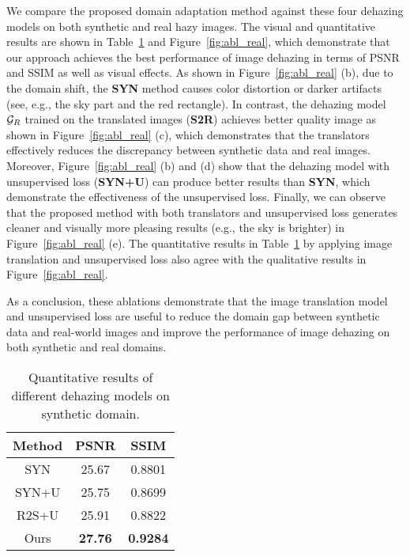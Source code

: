 \documentclass[10pt,twocolumn,letterpaper]{article}
\begin{document}
We compare the proposed domain adaptation method against these four dehazing models on both synthetic and real hazy images. 
The visual and quantitative results are shown in Table~\ref{tab:abl_syn} and Figure~\ref{fig:abl_real}, which demonstrate that our approach achieves the best performance of image dehazing in terms of PSNR and SSIM as well as visual effects.
As shown in Figure~\ref{fig:abl_real} (b), due to the domain shift, the \textbf{SYN} method causes color distortion or darker artifacts (see, e.g., the sky part and the red rectangle). 
In contrast, 
the dehazing model ${{\cal G}_R}$ trained on the translated images (\textbf{S2R}) achieves better quality image as shown in Figure~\ref{fig:abl_real} (c), which demonstrates that the translators effectively reduces the discrepancy between synthetic data and real images.
Moreover, Figure~\ref{fig:abl_real} (b) and (d) show that the dehazing model with unsupervised loss (\textbf{SYN+U}) can produce better results than \textbf{SYN}, which demonstrate the effectiveness of the unsupervised loss.
Finally, we can observe that the proposed method with both translators and unsupervised loss generates cleaner and visually more pleasing results (e.g., the sky is brighter) in Figure~\ref{fig:abl_real} (e).
The quantitative results in Table~\ref{tab:abl_syn} by applying image translation and unsupervised loss also agree with the qualitative results in Figure~\ref{fig:abl_real}. 

As a conclusion, these ablations demonstrate that the image translation model and unsupervised loss are useful to reduce the domain gap between synthetic data and real-world images and improve the performance of image dehazing on both synthetic and real domains.

\begin{table}[t]
\footnotesize
\centering
\caption{Quantitative results of different dehazing models on synthetic domain.}
\vspace{1mm}
\label{tab:abl_syn}
\begin{tabular}{ccc}
\toprule
Method		             &  PSNR      & SSIM 	    \\ \midrule
SYN			 &	25.67	  & 0.8801	    \\
SYN+U			 &  25.75	  & 0.8699	    \\
R2S+U	     &  25.91     & 0.8822       \\
Ours	     &  \textbf{27.76}     & \textbf{0.9284} \\\bottomrule
\end{tabular}
\end{table}
\end{document}
